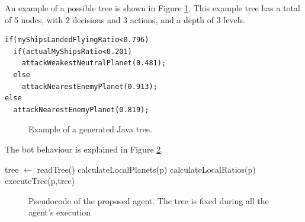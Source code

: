 An example of a possible tree is shown in Figure \ref{fig:java}. This example tree has a total of 5 nodes, with 2 decisions and 3 actions, and a depth of 3 levels.


\newsavebox{\javaboxrts}
\begin{lrbox}{\javaboxrts}
\begin{minipage}{10cm}
\begin{lstlisting}
if(myShipsLandedFlyingRatio<0.796)
  if(actualMyShipsRatio<0.201)
    attackWeakestNeutralPlanet(0.481);
  else
    attackNearestEnemyPlanet(0.913);
else
  attackNearestEnemyPlanet(0.819);
\end{lstlisting}
\end{minipage}
\end{lrbox}

\begin{figure} 
\usebox{\javaboxrts}
\caption{Example of a generated Java tree.}
\label{fig:java}
\end{figure}

The bot behaviour is explained in Figure \ref{alg:turn}.

\newsavebox{\algoartsbox}
\begin{lrbox}{\algoartsbox}
\begin{minipage}{10cm}
\begin{algorithmic}
\STATE tree $\gets$ readTree()
    \STATE calculateLocalPlanets(p)%
    \STATE calculateLocalRatios(p)%
    \STATE executeTree(p,tree)%
  \ENDFOR

\ENDWHILE
\end{algorithmic}
\end{minipage}
\end{lrbox}

\begin{figure}
\usebox{\algoartsbox}
\caption{Pseudocode of the proposed agent. The tree is fixed during all the agent's execution}
\label{alg:turn}
\end{figure}






	
